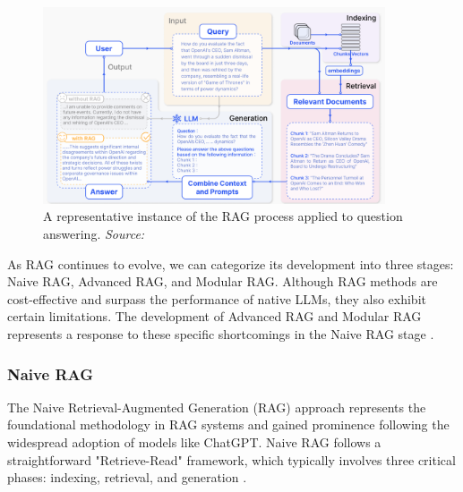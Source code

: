 \begin{figure}[h]
    \centering
    \includegraphics[width=0.9\textwidth]{images/llms/rag-strategies.png}
    \caption{A representative instance of the RAG process applied to question answering. \textit{Source:} \cite{gao2023retrieval}}
    \label{fig:rag_example}
\end{figure}

As RAG continues to evolve, we can categorize its development into three stages: Naive RAG, Advanced RAG, and Modular RAG. Although RAG methods are cost-effective and surpass the performance of native LLMs, they also exhibit certain limitations. The development of Advanced RAG and Modular RAG represents a response to these specific shortcomings in the Naive RAG stage \cite{gao2023retrieval}.

\subsubsection{Naive RAG}

The Naive Retrieval-Augmented Generation (RAG) approach represents the foundational methodology in RAG systems and gained prominence following the widespread adoption of models like ChatGPT. Naive RAG follows a straightforward "Retrieve-Read" framework, which typically involves three critical phases: indexing, retrieval, and generation \cite{ma2023query}.

